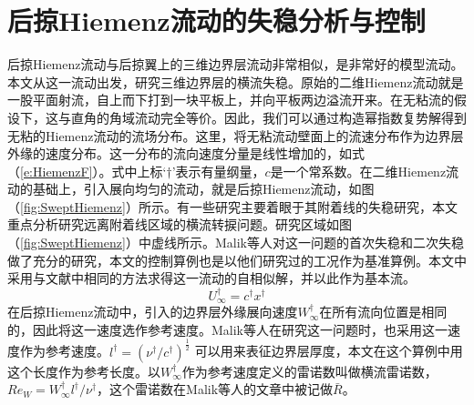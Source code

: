 \chapter{后掠Hiemenz流动的失稳分析与控制}
后掠Hiemenz流动与后掠翼上的三维边界层流动非常相似，是非常好的模型流动。本文从这一流动出发，研究三维边界层的横流失稳。原始的二维Hiemenz流动就是一股平面射流，自上而下打到一块平板上，并向平板两边溢流开来。在无粘流的假设下，这与直角的角域流动完全等价。因此，我们可以通过构造幂指数复势解得到无粘的Hiemenz流动的流场分布。这里，将无粘流动壁面上的流速分布作为边界层外缘的速度分布。这一分布的流向速度分量是线性增加的，如式（\ref{e:HiemenzF}）。式中上标`$\dagger$'表示有量纲量，$c$是一个常系数。在二维Hiemenz流动的基础上，引入展向均匀的流动，就是后掠Hiemenz流动，如图（\ref{fig:SweptHiemenz}）所示。有一些研究主要着眼于其附着线的失稳研究\cite{Lin1996,Guegan2006}，本文重点分析研究远离附着线区域的横流转捩问题。研究区域如图（\ref{fig:SweptHiemenz}）中虚线所示。Malik等人\cite{Malik1994}对这一问题的首次失稳和二次失稳做了充分的研究，本文的控制算例也是以他们研究过的工况作为基准算例。本文中采用与文献中\cite{Malik1994}相同的方法求得这一流动的自相似解，并以此作为基本流。
\begin{equation}\label{e:HiemenzF}
  U^{\dagger}_{\infty}=c^{\dagger}x^{\dagger}
\end{equation}
在后掠Hiemenz流动中，引入的边界层外缘展向速度$W_{\infty}^{\dagger}$在所有流向位置是相同的，因此将这一速度选作参考速度。Malik等人在研究这一问题时，也采用这一速度作为参考速度。$l^\dagger=(\nu^{\dagger}/c^{\dagger})^{\frac{1}{2}}$ 可以用来表征边界层厚度，本文在这个算例中用这个长度作为参考长度。以$W_{\infty}^{\dagger}$作为参考速度定义的雷诺数叫做横流雷诺数，$Re_W=W_{\infty}^{\dagger}l^\dagger/\nu^{\dagger}$，这个雷诺数在Malik等人的文章\cite{Malik1994}中被记做$\bar{R}$。
